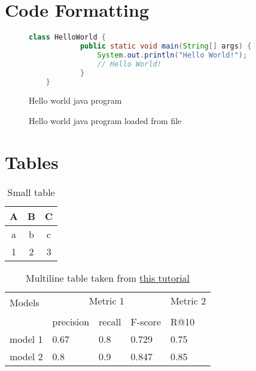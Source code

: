 \documentclass[10pt,parskip=half]{scrartcl}
\begin{document}
	
\tableofcontents
\pagebreak

\section{Code Formatting}

	\begin{figure}[htp]
		\begin{lstlisting}[language=java]
		class HelloWorld {
			public static void main(String[] args) {
				System.out.println("Hello World!"); 
				// Hello World!
			}
	}
	\end{lstlisting}
\caption{Hello world java program}
\end{figure}



\begin{figure}[htp]
	
	\caption{Hello world java program loaded from file}
\end{figure}

\section{Tables}
\begin{table}[h]
	\centering %
\begin{tabular}{ccc} \toprule 
	A & B & C \\
	\midrule 
	a&b&c \\ \cmidrule{1-1} %
	1&2&3\\ \bottomrule
\end{tabular}
\caption{Small table}
\end{table}

\begin{table}[h]
	\centering
	\begin{tabular}{lllll}
		\toprule
		\multirow{2}{*}{Models} & \multicolumn{3}{c}{Metric 1} & Metric 2\\
		\cmidrule{2-4} \cmidrule{5-5} \\
		{} & precision & recall & F-score  & R@10 \\
		\midrule
		model 1 & 0.67  & 0.8 & 0.729  & 0.75 \\
		model 2 & 0.8 & 0.9 & 0.847 & 0.85 \\
		\bottomrule
	\end{tabular}
\caption{Multiline table taken from \href{https://jdhao.github.io/2019/08/27/latex_table_with_booktabs/}{this tutorial}}
\end{table}
\end{document}
